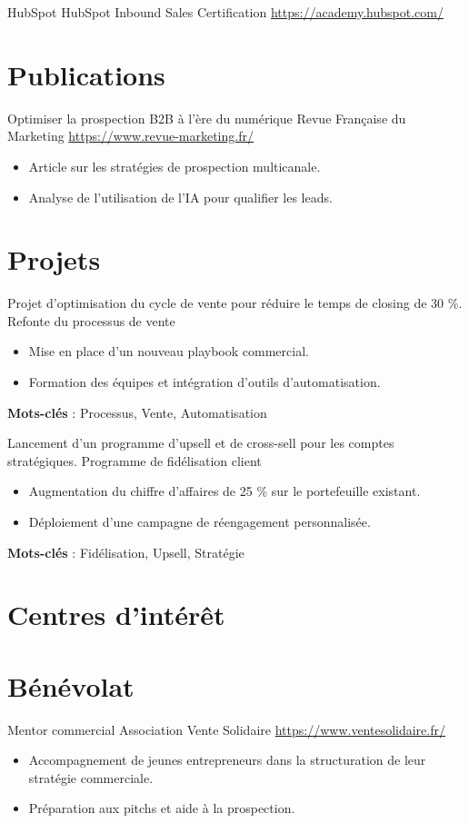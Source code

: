 \documentclass[a4paper, serif, 10pt]{moderncv}
\begin{document}
        {HubSpot}
        {HubSpot Inbound Sales Certification}
        {\url{https://academy.hubspot.com/}}
        {}
        {}
\section{Publications}

        {Optimiser la prospection B2B à l'ère du numérique}
        {Revue Française du Marketing}
        {\url{https://www.revue-marketing.fr/}}
        {}
        {\begin{itemize}
\item Article sur les stratégies de prospection multicanale.
\item Analyse de l'utilisation de l'IA pour qualifier les leads.
\end{itemize}}
\section{Projets}

        {Projet d'optimisation du cycle de vente pour réduire le temps de closing de 30 \%.}
        {Refonte du processus de vente}
        {}
        {}
        {\begin{itemize}
\item Mise en place d'un nouveau playbook commercial.
\item Formation des équipes et intégration d'outils d'automatisation.
\end{itemize}
\textbf{Mots-clés} : Processus, Vente, Automatisation}

        {Lancement d'un programme d'upsell et de cross-sell pour les comptes stratégiques.}
        {Programme de fidélisation client}
        {}
        {}
        {\begin{itemize}
\item Augmentation du chiffre d'affaires de 25 \% sur le portefeuille existant.
\item Déploiement d'une campagne de réengagement personnalisée.
\end{itemize}
\textbf{Mots-clés} : Fidélisation, Upsell, Stratégie}
\section{Centres d'intérêt}

\section{Bénévolat}

        {Mentor commercial}
        {Association Vente Solidaire}
        {\url{https://www.ventesolidaire.fr/}}
        {}
        {\begin{itemize}
\item Accompagnement de jeunes entrepreneurs dans la structuration de leur stratégie commerciale.
\item Préparation aux pitchs et aide à la prospection.
\end{itemize}}
    
\end{document}
